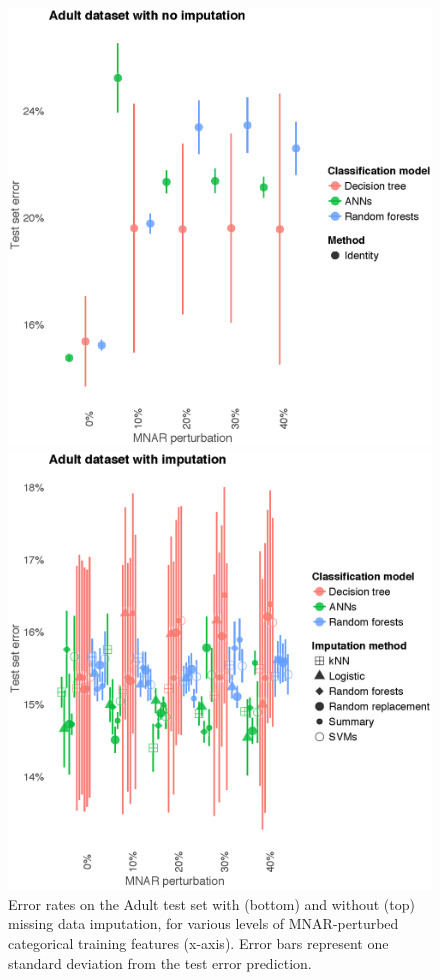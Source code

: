 \documentclass[10pt]{book}
\theoremstyle{definition}
\begin{document}
\begin{figure}[h!]
\includegraphics[scale=0.55, center]{figure/test-errors-adult-no-imp-mnar}\par
\includegraphics[scale=0.55, center]{figure/test-errors-adult-imp-mnar}\par
   \caption{\footnotesize Error rates on the Adult test set with (bottom) and without (top) missing data imputation, for various levels of MNAR-perturbed categorical training features (x-axis). Error bars represent one standard deviation from the test error prediction.}
   \label{fig:test-error-adult-mnar}
\end{figure}
\end{document}
